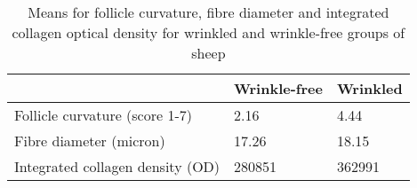 %

\begin{table}[htp]
\centering
\caption{Means for follicle curvature, fibre diameter and integrated collagen optical density for wrinkled and wrinkle-free groups of sheep}
\label{tab:curv}
\vspace{0.1in}
\begin{tabular}{|p{2.0in}|p{1.0in}|p{1.0in}|}  \hline
      & Wrinkle-free  &  Wrinkled  \\ 
\hline 
Follicle curvature (score 1-7) & 2.16 & 4.44 \\
Fibre diameter  (micron)    & 17.26 & 18.15 \\
Integrated collagen density (OD) & 280851 & 362991 \\
\hline

\end{tabular}
\end{table}

%
